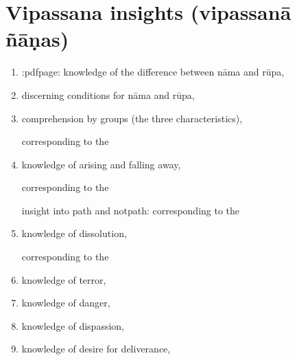 \documentclass[letterpaper,10pt,english]{sphinxmanual}
\begin{document}
\section{Vipassana insights (vipassanā ñāṇas)}
\label{\detokenize{appendices:vipassana-insights-vipassana-nanas}}\begin{enumerate}
%
\item {} 
\sphinxAtStartPar
:pdfpage: knowledge of the difference between nāma and rūpa, 

\item {} 
\sphinxAtStartPar
discerning conditions for nāma and rūpa, 

\item {} 
\sphinxAtStartPar
comprehension by groups (the three characteristics), 

\sphinxAtStartPar
corresponding to the 

\item {} 
\sphinxAtStartPar
knowledge of arising and falling away, 

\sphinxAtStartPar
corresponding to the 

\sphinxAtStartPar
insight into path and not\sphinxhyphen{}path: corresponding to the 

\item {} 
\sphinxAtStartPar
knowledge of dissolution, 

\sphinxAtStartPar
corresponding to the 

\item {} 
\sphinxAtStartPar
knowledge of terror, 

\item {} 
\sphinxAtStartPar
knowledge of danger, 

\item {} 
\sphinxAtStartPar
knowledge of dispassion, 

\item {} 
\sphinxAtStartPar
knowledge of desire for deliverance, 


\end{enumerate}
\end{document}
